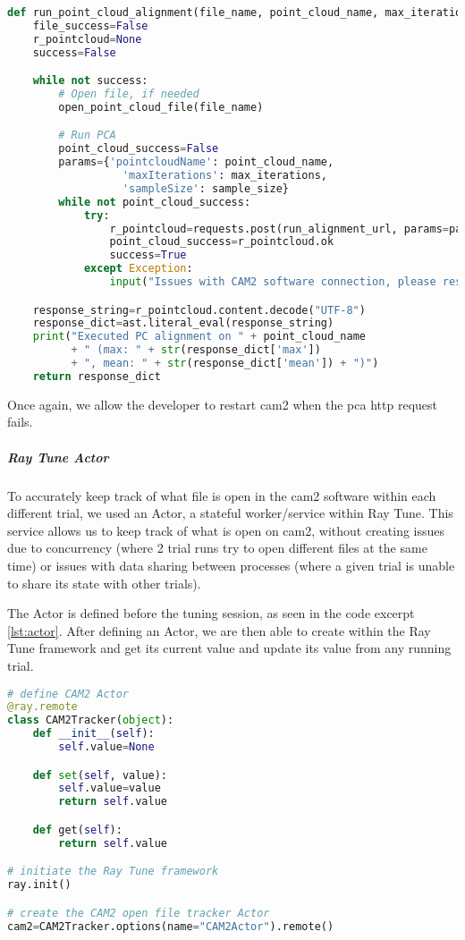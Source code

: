 \begin{lstlisting}[language=Python, caption=Running \acrshort{pca} function in \acrshort{cam2}, captionpos=b, label={lst:cam2_file}]
def run_point_cloud_alignment(file_name, point_cloud_name, max_iterations, sample_size):
    file_success=False
    r_pointcloud=None
    success=False

    while not success:
        # Open file, if needed
        open_point_cloud_file(file_name)

        # Run PCA
        point_cloud_success=False
        params={'pointcloudName': point_cloud_name,
                  'maxIterations': max_iterations,
                  'sampleSize': sample_size}
        while not point_cloud_success:
            try:
                r_pointcloud=requests.post(run_alignment_url, params=params)
                point_cloud_success=r_pointcloud.ok
                success=True
            except Exception:
                input("Issues with CAM2 software connection, please restart the CAM2 software.")

    response_string=r_pointcloud.content.decode("UTF-8")
    response_dict=ast.literal_eval(response_string)
    print("Executed PC alignment on " + point_cloud_name
          + " (max: " + str(response_dict['max'])
          + ", mean: " + str(response_dict['mean']) + ")")
    return response_dict
\end{lstlisting}

Once again, we allow the developer to restart \acrshort{cam2} when the \acrshort{pca} \acrshort{http} request fails.

\subparagraph{Ray Tune Actor}

To accurately keep track of what file is open in the \acrshort{cam2} software within each different trial, we used an Actor, a stateful worker/service within Ray Tune. This service allows us to keep track of what is open on \acrshort{cam2}, without creating issues due to concurrency (where 2 trial runs try to open different files at the same time) or issues with data sharing between processes (where a given trial is unable to share its state with other trials). 

The Actor is defined before the tuning session, as seen in the code excerpt \ref{lst:actor}. After defining an Actor, we are then able to create within the Ray Tune framework and get its current value and update its value from any running trial.

\begin{lstlisting}[language=Python, caption=Initiating a Ray Tune Actor, captionpos=b, label={lst:actor}]
# define CAM2 Actor
@ray.remote
class CAM2Tracker(object):
    def __init__(self):
        self.value=None

    def set(self, value):
        self.value=value
        return self.value

    def get(self):
        return self.value

# initiate the Ray Tune framework
ray.init()

# create the CAM2 open file tracker Actor
cam2=CAM2Tracker.options(name="CAM2Actor").remote()
\end{lstlisting}

